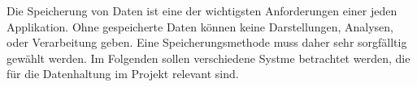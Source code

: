 Die Speicherung von Daten ist eine der wichtigsten Anforderungen einer jeden Applikation. Ohne gespeicherte Daten können keine Darstellungen, Analysen, oder Verarbeitung geben. Eine Speicherungsmethode muss daher sehr sorgfälltig gewählt werden. Im Folgenden sollen verschiedene Systme betrachtet werden, die für die Datenhaltung im Projekt relevant sind.